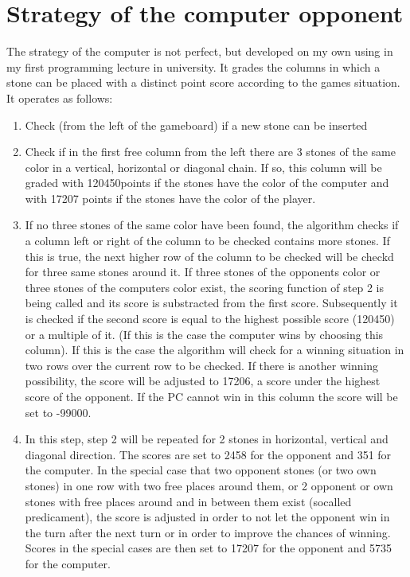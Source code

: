 \documentclass[10pt,a4paper,titlepage]{article}
\begin{document}
\section{Strategy of the computer opponent}
The strategy of the computer is not perfect, but developed on my own using in my first programming lecture in university. It grades the columns in which a stone can be placed with a distinct point score according to the games situation.\\
It operates as follows:
\begin{enumerate}
	\item Check (from the left of the gameboard) if a new stone can be inserted
	\item Check if in the first free column from the left there are 3 stones of the same color in a vertical, horizontal or diagonal chain. If so, this column will be graded with 120450points if the stones have the color of the computer and with 17207 points if the stones have the color of the player.
	\item  If no three stones of the same color have been found, the algorithm checks if a column left or right of the column to be checked contains more stones. If this is true, the next higher row of the column to be checked will be checkd for three same stones around it.
	If three stones of the opponents color or three stones of the computers color exist, the scoring function of step 2 is being called and its score is substracted from the first score. Subsequently it is checked if the second score is equal to the highest possible score (120450) or a multiple of it. (If this is the case the computer wins by choosing this column). If this is the case the algorithm will check for a winning situation in two rows over the current row to be checked. If there is another winning possibility, the score will be adjusted to 17206, a score under the highest score of the opponent. If the PC cannot win in this column the score will be set to -99000.
	\item In this step, step 2 will be repeated for 2 stones in horizontal, vertical and diagonal direction. The scores are set to 2458 for the opponent and 351 for the computer.
	In the special case that two opponent stones (or two own stones) in one row with two free places around them, or 2 opponent or own stones with free places around and in between them exist (socalled predicament), the score is adjusted in order to not let the opponent win in the turn after the next turn or in order to improve the chances of winning. Scores in the special cases are then set to 17207 for the opponent and 5735 for the computer.

\end{enumerate}
\end{document}
